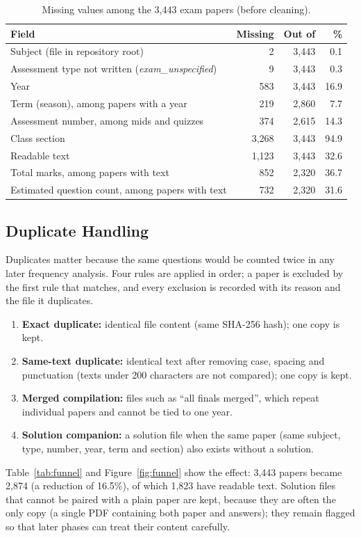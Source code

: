 \documentclass[11pt,a4paper]{article}
\begin{document}
\begin{table}[H]
\centering
\caption{Missing values among the 3{,}443 exam papers (before cleaning).}
\label{tab:missing}
\begin{tabular}{lrrr}
\toprule
Field & Missing & Out of & \% \\
\midrule
Subject (file in repository root) & 2 & 3{,}443 & 0.1 \\
Assessment type not written (\emph{exam\_unspecified}) & 9 & 3{,}443 & 0.3 \\
Year & 583 & 3{,}443 & 16.9 \\
Term (season), among papers with a year & 219 & 2{,}860 & 7.7 \\
Assessment number, among mids and quizzes & 374 & 2{,}615 & 14.3 \\
Class section & 3{,}268 & 3{,}443 & 94.9 \\
Readable text & 1{,}123 & 3{,}443 & 32.6 \\
Total marks, among papers with text & 852 & 2{,}320 & 36.7 \\
Estimated question count, among papers with text & 732 & 2{,}320 & 31.6 \\
\bottomrule
\end{tabular}
\end{table}

\subsection{Duplicate Handling}
\label{sec:dups}
Duplicates matter because the same questions would be counted twice in any later frequency analysis. Four rules are applied in order; a paper is excluded by the first rule that matches, and every exclusion is recorded with its reason and the file it duplicates.
\begin{enumerate}
  \item \textbf{Exact duplicate:} identical file content (same SHA-256 hash); one copy is kept.
  \item \textbf{Same-text duplicate:} identical text after removing case, spacing and punctuation (texts under 200 characters are not compared); one copy is kept.
  \item \textbf{Merged compilation:} files such as ``all finals merged'', which repeat individual papers and cannot be tied to one year.
  \item \textbf{Solution companion:} a solution file when the same paper (same subject, type, number, year, term and section) also exists without a solution.
\end{enumerate}
Table~\ref{tab:funnel} and Figure~\ref{fig:funnel} show the effect: 3{,}443 papers became 2{,}874 (a reduction of 16.5\%), of which 1{,}823 have readable text. Solution files that cannot be paired with a plain paper are kept, because they are often the only copy (a single PDF containing both paper and answers); they remain flagged so that later phases can treat their content carefully.
\end{document}
